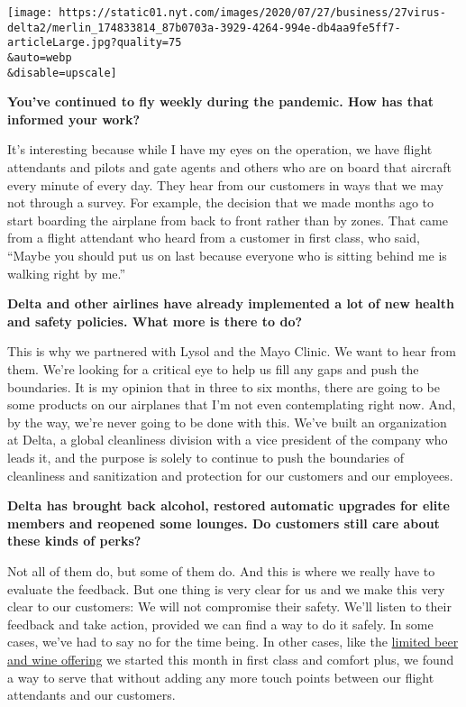 \texttt{[image: https://static01.nyt.com/images/2020/07/27/business/27virus-delta2/merlin\_174833814\_87b0703a-3929-4264-994e-db4aa9fe5ff7-articleLarge.jpg?quality=75\\\&auto=webp\\\&disable=upscale]}

\textbf{You've continued to fly weekly during the pandemic. How has that
informed your work?}

It's interesting because while I have my eyes on the operation, we have
flight attendants and pilots and gate agents and others who are on board
that aircraft every minute of every day. They hear from our customers in
ways that we may not through a survey. For example, the decision that we
made months ago to start boarding the airplane from back to front rather
than by zones. That came from a flight attendant who heard from a
customer in first class, who said, ``Maybe you should put us on last
because everyone who is sitting behind me is walking right by me.''

\textbf{Delta and other airlines have already implemented a lot of new
health and safety policies. What more is there to do?}

This is why we partnered with Lysol and the Mayo Clinic. We want to hear
from them. We're looking for a critical eye to help us fill any gaps and
push the boundaries. It is my opinion that in three to six months, there
are going to be some products on our airplanes that I'm not even
contemplating right now. And, by the way, we're never going to be done
with this. We've built an organization at Delta, a global cleanliness
division with a vice president of the company who leads it, and the
purpose is solely to continue to push the boundaries of cleanliness and
sanitization and protection for our customers and our employees.

\textbf{Delta has brought back alcohol, restored automatic upgrades for
elite members and reopened some lounges. Do customers still care about
these kinds of perks?}

Not all of them do, but some of them do. And this is where we really
have to evaluate the feedback. But one thing is very clear for us and we
make this very clear to our customers: We will not compromise their
safety. We'll listen to their feedback and take action, provided we can
find a way to do it safely. In some cases, we've had to say no for the
time being. In other cases, like the
\href{https://news.delta.com/beverage-service-returns-delta-reintroduces-select-beer-and-wine-domestic-flights-added-safety}{limited
beer and wine offering} we started this month in first class and comfort
plus, we found a way to serve that without adding any more touch points
between our flight attendants and our customers.

